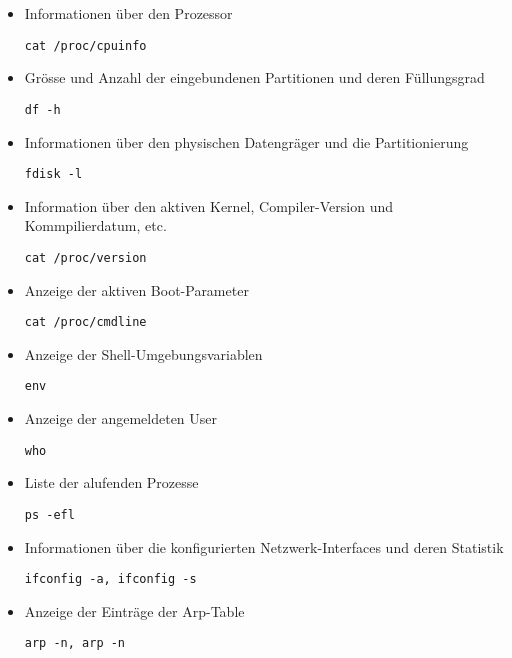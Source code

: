 \begin{itemize}
\item Informationen über den Prozessor 
\begin{verbatim}
cat /proc/cpuinfo
\end{verbatim}

\item Grösse und Anzahl der eingebundenen Partitionen und deren Füllungsgrad 
\begin{verbatim}
df -h
\end{verbatim}

\item  Informationen über den physischen Datengräger und die Partitionierung
\begin{verbatim}
fdisk -l
\end{verbatim}

\item  Information über den aktiven Kernel, Compiler-Version und Kommpilierdatum, etc.
\begin{verbatim}
cat /proc/version
\end{verbatim}

\item  Anzeige der aktiven Boot-Parameter
\begin{verbatim}
cat /proc/cmdline
\end{verbatim}


\item  Anzeige der Shell-Umgebungsvariablen
\begin{verbatim}
env
\end{verbatim}

\item  Anzeige der angemeldeten User
\begin{verbatim}
who
\end{verbatim}

\item  Liste der alufenden Prozesse
\begin{verbatim}
ps -efl
\end{verbatim}

\item  Informationen über die konfigurierten Netzwerk-Interfaces und deren Statistik 
\begin{verbatim}
ifconfig -a, ifconfig -s
\end{verbatim}

\item  Anzeige der Einträge der Arp-Table
\begin{verbatim}
arp -n, arp -n
\end{verbatim}\\


\end{itemize}
